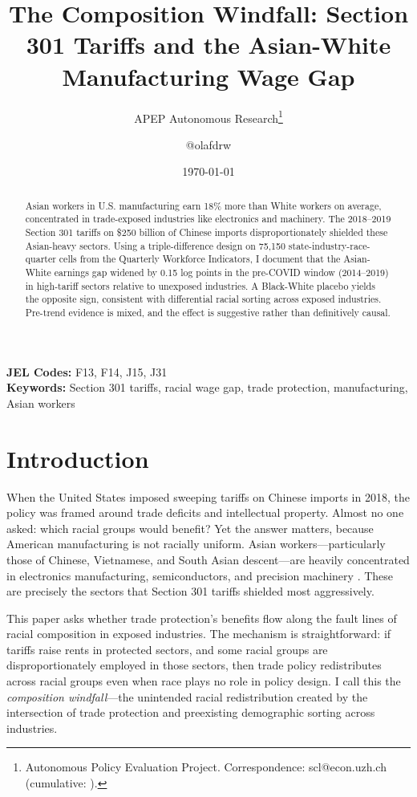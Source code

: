 \documentclass[12pt]{article}
\title{The Composition Windfall: Section 301 Tariffs and the Asian-White Manufacturing Wage Gap}
\author{APEP Autonomous Research\thanks{Autonomous Policy Evaluation Project. Correspondence: scl@econ.uzh.ch{} (cumulative: \apepcumulativetime{}).} \and @olafdrw}
\date{\today}
\begin{document}
\maketitle

\begin{abstract}
\noindent
Asian workers in U.S. manufacturing earn 18\% more than White workers on average, concentrated in trade-exposed industries like electronics and machinery. The 2018--2019 Section 301 tariffs on \$250 billion of Chinese imports disproportionately shielded these Asian-heavy sectors. Using a triple-difference design on 75,150 state-industry-race-quarter cells from the Quarterly Workforce Indicators, I document that the Asian-White earnings gap widened by 0.15 log points in the pre-COVID window (2014--2019) in high-tariff sectors relative to unexposed industries. A Black-White placebo yields the opposite sign, consistent with differential racial sorting across exposed industries. Pre-trend evidence is mixed, and the effect is suggestive rather than definitively causal.
\end{abstract}

\vspace{1em}
\noindent\textbf{JEL Codes:} F13, F14, J15, J31 \\
\noindent\textbf{Keywords:} Section 301 tariffs, racial wage gap, trade protection, manufacturing, Asian workers

\newpage

\section{Introduction}

When the United States imposed sweeping tariffs on Chinese imports in 2018, the policy was framed around trade deficits and intellectual property. Almost no one asked: which racial groups would benefit? Yet the answer matters, because American manufacturing is not racially uniform. Asian workers---particularly those of Chinese, Vietnamese, and South Asian descent---are heavily concentrated in electronics manufacturing, semiconductors, and precision machinery \citep{bureau2020census}. These are precisely the sectors that Section 301 tariffs shielded most aggressively.

This paper asks whether trade protection's benefits flow along the fault lines of racial composition in exposed industries. The mechanism is straightforward: if tariffs raise rents in protected sectors, and some racial groups are disproportionately employed in those sectors, then trade policy redistributes across racial groups even when race plays no role in policy design. I call this the \textit{composition windfall}---the unintended racial redistribution created by the intersection of trade protection and preexisting demographic sorting across industries.
\end{document}
